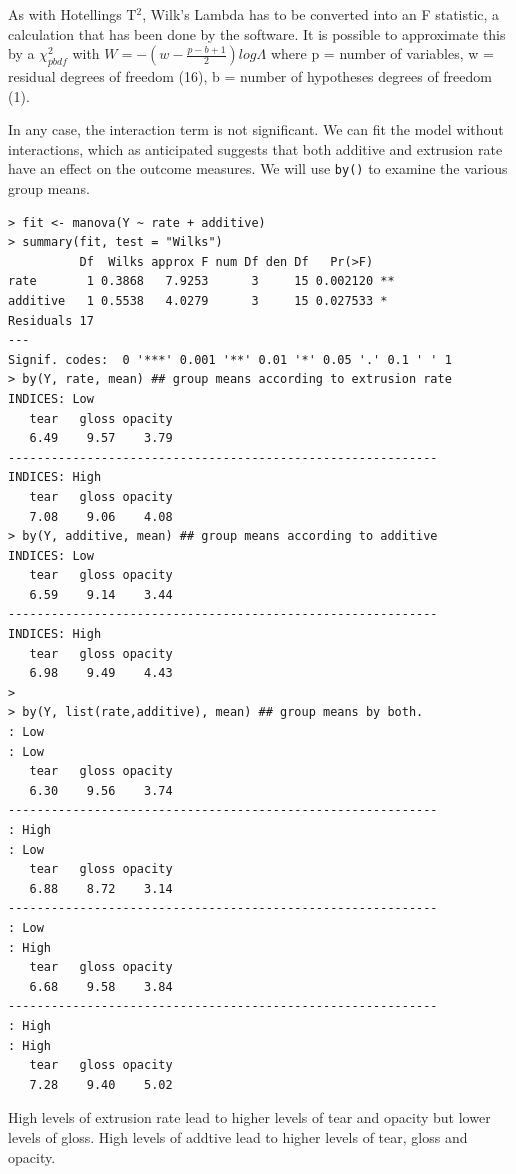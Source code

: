As with Hotellings T$^{2}$, Wilk's Lambda has to be converted into an F statistic, a calculation that has been done by the software.   It is possible to approximate this by a $\chi^{2}_{pb df}$ with $W = -\left( w - \frac{p - b + 1}{2}\right)log \Lambda$ where p = number of variables, w = residual degrees of freedom (16), b = number of hypotheses degrees of freedom (1).

In any case, the interaction term is not significant.   We can fit the model without interactions, which as anticipated suggests that both additive and extrusion rate have an effect on the outcome measures.   We will use \texttt{by()} to examine the various group means.

\singlespacing
\begin{verbatim}
> fit <- manova(Y ~ rate + additive)
> summary(fit, test = "Wilks")
          Df  Wilks approx F num Df den Df   Pr(>F)   
rate       1 0.3868   7.9253      3     15 0.002120 **
additive   1 0.5538   4.0279      3     15 0.027533 * 
Residuals 17                                          
---
Signif. codes:  0 '***' 0.001 '**' 0.01 '*' 0.05 '.' 0.1 ' ' 1 
> by(Y, rate, mean) ## group means according to extrusion rate
INDICES: Low
   tear   gloss opacity 
   6.49    9.57    3.79 
------------------------------------------------------------ 
INDICES: High
   tear   gloss opacity 
   7.08    9.06    4.08 
> by(Y, additive, mean) ## group means according to additive
INDICES: Low
   tear   gloss opacity 
   6.59    9.14    3.44 
------------------------------------------------------------ 
INDICES: High
   tear   gloss opacity 
   6.98    9.49    4.43 
> 
> by(Y, list(rate,additive), mean) ## group means by both.
: Low
: Low
   tear   gloss opacity 
   6.30    9.56    3.74 
------------------------------------------------------------ 
: High
: Low
   tear   gloss opacity 
   6.88    8.72    3.14 
------------------------------------------------------------ 
: Low
: High
   tear   gloss opacity 
   6.68    9.58    3.84 
------------------------------------------------------------ 
: High
: High
   tear   gloss opacity 
   7.28    9.40    5.02 
\end{verbatim}
\onehalfspacing

High levels of extrusion rate lead to higher levels of tear and opacity but lower levels of gloss.   High levels of addtive lead to higher levels of tear, gloss and opacity.






